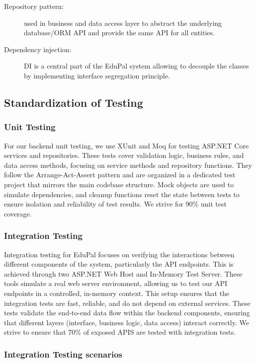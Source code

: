\begin{description}
  \item[Repository pattern:] used in business and data access layer to abstract the underlying database/ORM API and provide the same API for all entities.
  \item[Dependency injection:] DI is a central part of the EduPal system allowing to decouple the classes by implementing interface segregation principle.
\end{description}

\subsection{Standardization of Testing}

\subsubsection{Unit Testing}
For our backend unit testing, we use XUnit and Moq for testing ASP.NET Core services and repositories. These tests cover validation logic, business rules, and data access methods, focusing on service methods and repository functions. They follow the Arrange-Act-Assert pattern and are organized in a dedicated test project that mirrors the main codebase structure. Mock objects are used to simulate dependencies, and cleanup functions reset the state between tests to ensure isolation and reliability of test results. We strive for 90\% unit test coverage.

\subsubsection{Integration Testing}
Integration testing for EduPal focuses on verifying the interactions between different components of the system, particularly the API endpoints. This is achieved through two ASP.NET Web Host and In-Memory Test Server. These tools simulate a real web server environment, allowing us to test our API endpoints in a controlled, in-memory context. This setup ensures that the integration tests are fast, reliable, and do not depend on external services.
These tests validate the end-to-end data flow within the backend components, ensuring that different layers (interface, business logic, data access) interact correctly. We strive to ensure that 70\% of exposed APIS are tested with integration tests.

\subsubsection{Integration Testing scenarios}

